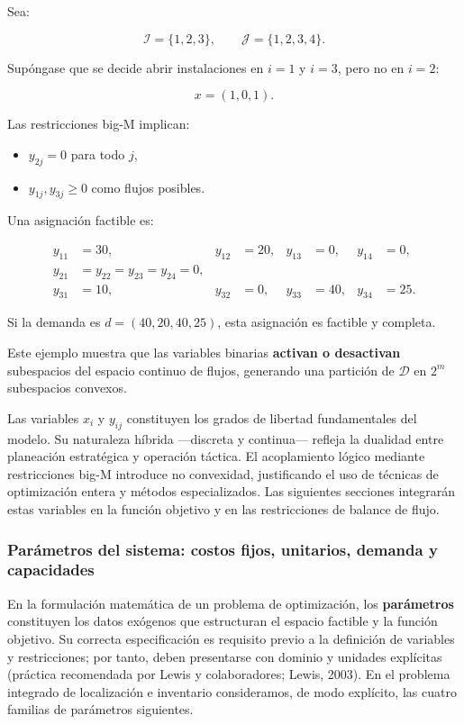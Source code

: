 \documentclass[
  spanish,
  letterpaper,
  DIV=11,
  numbers=noendperiod]{scrartcl}
\providecommand{\tightlist}{%
  \setlength{\itemsep}{0pt}\setlength{\parskip}{0pt}}
\begin{document}
Sea:

\[
\mathcal{I} = \{1,2,3\}, \qquad \mathcal{J} = \{1,2,3,4\}.
\]

Supóngase que se decide abrir instalaciones en \(i=1\) y \(i=3\), pero
no en \(i=2\):

\[
x = (1,0,1).
\]

Las restricciones big-M implican:

\begin{itemize}
\tightlist
\item
  \(y_{2j} = 0\) para todo \(j\),
\item
  \(y_{1j}, y_{3j} \ge 0\) como flujos posibles.
\end{itemize}

Una asignación factible es:

\[
\begin{aligned}
y_{11} &= 30, & y_{12} &= 20, & y_{13} &= 0, & y_{14} &= 0, \\
y_{21} &= y_{22} = y_{23} = y_{24} = 0, \\
y_{31} &= 10, & y_{32} &= 0, & y_{33} &= 40, & y_{34} &= 25.
\end{aligned}
\]

Si la demanda es \(d = (40,20,40,25)\), esta asignación es factible y
completa.

Este ejemplo muestra que las variables binarias \textbf{activan o
desactivan} subespacios del espacio continuo de flujos, generando una
partición de \(\mathcal{D}\) en \(2^m\) subespacios convexos.

Las variables \(x_i\) y \(y_{ij}\) constituyen los grados de libertad
fundamentales del modelo. Su naturaleza híbrida ---discreta y
continua--- refleja la dualidad entre planeación estratégica y operación
táctica. El acoplamiento lógico mediante restricciones big-M introduce
no convexidad, justificando el uso de técnicas de optimización entera y
métodos especializados. Las siguientes secciones integrarán estas
variables en la función objetivo y en las restricciones de balance de
flujo.

\subsubsection{Parámetros del sistema: costos fijos, unitarios, demanda
y
capacidades}\label{paruxe1metros-del-sistema-costos-fijos-unitarios-demanda-y-capacidades}

En la formulación matemática de un problema de optimización, los
\textbf{parámetros} constituyen los datos exógenos que estructuran el
espacio factible y la función objetivo. Su correcta especificación es
requisito previo a la definición de variables y restricciones; por
tanto, deben presentarse con dominio y unidades explícitas (práctica
recomendada por Lewis y colaboradores; Lewis, 2003). En el problema
integrado de localización e inventario consideramos, de modo explícito,
las cuatro familias de parámetros siguientes.
\end{document}
